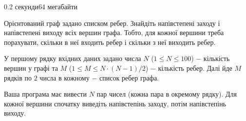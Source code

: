 \begin{problem}{}{}{}{0.2 секунди}{64 мегабайти}

Орієнтований граф задано списком ребер. Знайдіть напівстепені заходу і напівстепені виходу всіх вершин графа.
Тобто, для кожної вершини треба порахувати, скільки в неї входить ребер і скільки з неї виходить ребер.

\InputFile
У першому рядку вхідних даних задано числа $N$ ($1 \le N \le 100$) $-$ кількість вершин у графі та 
$M$ ($1 \le M \le N\cdot (N-1)/2$) $-$ кількість ребер.
Далі йде $M$ рядків по $2$ числа в кожному $-$ список ребер графа. 

\OutputFile
Ваша програма має вивести $N$ пар чисел (кожна пара в окремому рядку). Для кожної вершини спочатку виведіть 
напівстепінь заходу, потім напівстепінь виходу.

\Example

\begin{example}
%
\end{example}

\end{problem}

